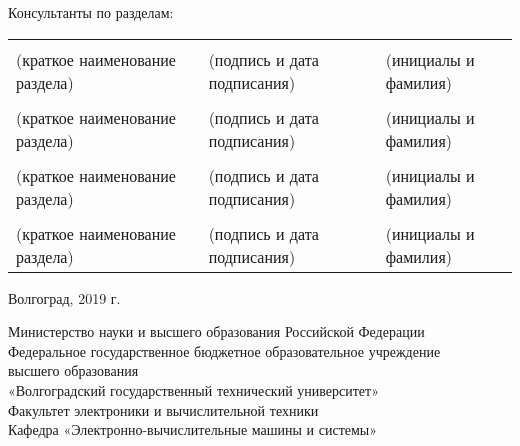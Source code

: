 \begin{nospasing}
\bigskip
\bigskip

\noindent
Консультанты по разделам: \\
\noindent
\begin{tabularx}{\linewidth}{@{}llYlY@{}}
	&&  &&  \\
	\footnotesize(краткое наименование раздела)\normalsize && \footnotesize(подпись и дата подписания)\normalsize && \footnotesize(инициалы и фамилия)\normalsize \\
	&&  &&  \\
	\footnotesize(краткое наименование раздела)\normalsize && \footnotesize(подпись и дата подписания)\normalsize && \footnotesize(инициалы и фамилия)\normalsize \\
	&&  &&  \\
	\footnotesize(краткое наименование раздела)\normalsize && \footnotesize(подпись и дата подписания)\normalsize && \footnotesize(инициалы и фамилия)\normalsize \\
	&&  &&  \\
	\footnotesize(краткое наименование раздела)\normalsize && \footnotesize(подпись и дата подписания)\normalsize && \footnotesize(инициалы и фамилия)\normalsize
\end{tabularx}
\end{nospasing}

\begin{center}
	Волгоград, 2019 г.
\end{center}


\newpage

\thispagestyle{empty}

\begin{nospasing}
    \begin{center}
        Министерство науки и высшего образования Российской Федерации \\
        Федеральное государственное бюджетное образовательное учреждение \\
        высшего образования \\
        «Волгоградский государственный технический университет» \\
        Факультет электроники и вычислительной техники \\
        Кафедра «Электронно-вычислительные машины и системы» \\
    \end{center}
\end{nospasing}

